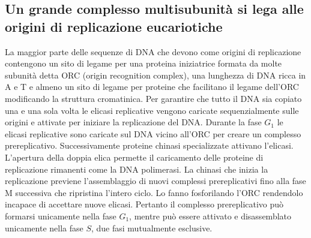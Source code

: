\subsection{Un grande complesso multisubunit\`a si lega alle origini di replicazione eucariotiche}
La maggior parte delle sequenze di DNA che devono come origini di replicazione contengono un sito di legame per una proteina iniziatrice formata da molte subunit\`a detta ORC (origin
recognition complex), una lunghezza di DNA ricca in A e T e almeno un sito di legame per proteine che facilitano il legame dell'ORC modificando la struttura cromatinica. Per garantire
che tutto il DNA sia copiato una e una sola volta le elicasi replicative vengono caricate sequenzialmente sulle origini e attivate per iniziare la replicazione del DNA. Durante la fase
$G_1$ le elicasi replicative sono caricate sul DNA vicino all'ORC per creare un complesso prereplicativo. Successivamente proteine chinasi specializzate attivano l'elicasi. L'apertura
della doppia elica permette il caricamento delle proteine di replicazione rimanenti come la DNA polimerasi. La chinasi che inizia la replicazione previene l'assemblaggio di nuovi 
complessi prereplicativi fino alla fase M successiva che ripristina l'intero ciclo. Lo fanno fosforilando l'ORC rendendolo incapace di accettare nuove elicasi. Pertanto il complesso 
prereplicativo pu\`o formarsi unicamente nella fase $G_1$, mentre pu\`o essere attivato e disassemblato unicamente nella fase $S$, due fasi mutualmente esclusive. 
